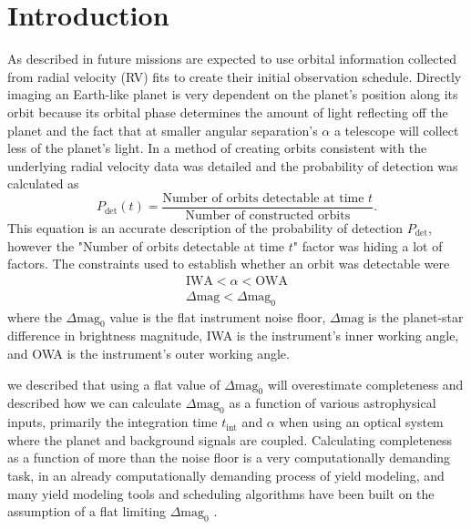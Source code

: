 \section{Introduction}
\label{sec:accurate_pdet_intro}

As described in  future missions are expected to use
orbital information collected from radial velocity (RV) fits to create their
initial observation schedule. Directly imaging an Earth-like planet is very
dependent on the planet's position along its orbit because its orbital phase
determines the amount of light reflecting off the planet and the fact that at
smaller angular separation's $\alpha$ a telescope will collect less of the planet's
light. In  a method of creating orbits consistent
with the underlying radial velocity data was detailed and the probability
of detection was calculated as
\begin{equation}
    P_{\textrm{det}}(t) = \frac{\textrm{Number of orbits detectable at time $t$}}{\textrm{Number of
    constructed orbits}}
.\end{equation}
This equation is an accurate description of the probability of detection
$P_\textrm{det}$, however the "Number of orbits detectable at time $t$" factor
was hiding a lot of factors. The constraints used to establish whether an orbit
was detectable were
\begin{align}
    \text{IWA} < \alpha < \text{OWA}\\
    \Delta\mathrm{mag} < \Delta\mathrm{mag}_0
\end{align}
where the $\Delta\textrm{mag}_0$ value is the flat instrument noise floor,
$\Delta\textrm{mag}$ is the planet-star difference in brightness magnitude, IWA
is the instrument's inner working angle, and OWA is the instrument's outer
working angle.

 we described that using a flat value of
$\Delta\textrm{mag}_0$ will overestimate completeness and described how we can
calculate $\Delta\textrm{mag}_0$ as a function of various astrophysical inputs,
primarily the integration time $t_\textrm{int}$ and $\alpha$ when using an
optical system where the planet and background signals are coupled. Calculating
completeness as a function of more than the noise floor is a very
computationally demanding task, in an already computationally demanding process
of yield modeling, and many yield modeling tools and scheduling algorithms have
been built on the assumption of a flat limiting $\Delta\textrm{mag}_0$
\citep{savranskyAnalyzingDesignsPlanetFinding2010,starkMaximizingExoEarthCandidate2014,
keithlyOptimalScheduling2020, garrettAnalyticalFormulation2016,
keithlyIntegrationTime2021, morganFasterExoEarth2021}.

